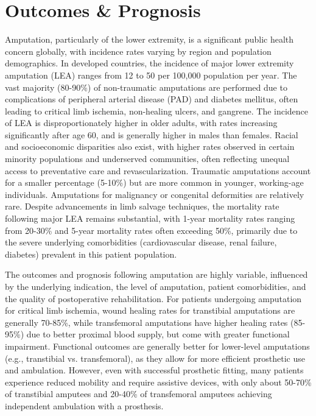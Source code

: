 \section*{Outcomes \& Prognosis}
Amputation, particularly of the lower extremity, is a significant public health concern globally, with incidence rates varying by region and population demographics. In developed countries, the incidence of major lower extremity amputation (LEA) ranges from 12 to 50 per 100,000 population per year. The vast majority (80-90\%) of non-traumatic amputations are performed due to complications of peripheral arterial disease (PAD) and diabetes mellitus, often leading to critical limb ischemia, non-healing ulcers, and gangrene. The incidence of LEA is disproportionately higher in older adults, with rates increasing significantly after age 60, and is generally higher in males than females. Racial and socioeconomic disparities also exist, with higher rates observed in certain minority populations and underserved communities, often reflecting unequal access to preventative care and revascularization. Traumatic amputations account for a smaller percentage (5-10\%) but are more common in younger, working-age individuals. Amputations for malignancy or congenital deformities are relatively rare. Despite advancements in limb salvage techniques, the mortality rate following major LEA remains substantial, with 1-year mortality rates ranging from 20-30\% and 5-year mortality rates often exceeding 50\%, primarily due to the severe underlying comorbidities (cardiovascular disease, renal failure, diabetes) prevalent in this patient population.

The outcomes and prognosis following amputation are highly variable, influenced by the underlying indication, the level of amputation, patient comorbidities, and the quality of postoperative rehabilitation. For patients undergoing amputation for critical limb ischemia, wound healing rates for transtibial amputations are generally 70-85\%, while transfemoral amputations have higher healing rates (85-95\%) due to better proximal blood supply, but come with greater functional impairment. Functional outcomes are generally better for lower-level amputations (e.g., transtibial vs. transfemoral), as they allow for more efficient prosthetic use and ambulation. However, even with successful prosthetic fitting, many patients experience reduced mobility and require assistive devices, with only about 50-70\% of transtibial amputees and 20-40\% of transfemoral amputees achieving independent ambulation with a prosthesis.

